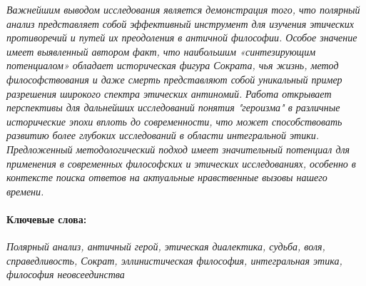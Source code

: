     \textit{Важнейшим выводом исследования является демонстрация того, что полярный анализ представляет собой эффективный инструмент для изучения этических противоречий и путей их преодоления в античной философии. Особое значение имеет выявленный автором факт, что наибольшим «синтезирующим потенциалом» обладает историческая фигура Сократа, чья жизнь, метод философствования и даже смерть представляют собой уникальный пример разрешения широкого спектра этических антиномий.}
    \textit{Работа открывает перспективы для дальнейших исследований понятия "героизма" в различные исторические эпохи вплоть до современности, что может способствовать развитию более глубоких исследований в области интегральной этики. Предложенный методологический подход имеет значительный потенциал для применения в современных философских и этических исследованиях, особенно в контексте поиска ответов на актуальные нравственные вызовы нашего времени.}

    \paragraph{Ключевые слова:} {\itshape Полярный анализ, античный герой, этическая диалектика, судьба, воля, справедливость, Сократ, эллинистическая философия, интегральная этика, философия неовсеединства}

